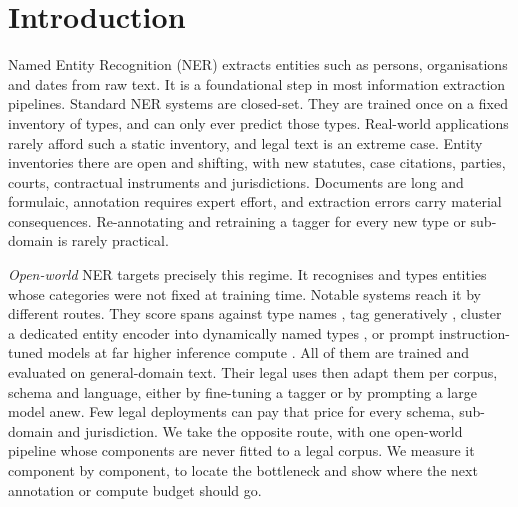 \section{Introduction}
\label{sec:introduction}

Named Entity Recognition (NER) extracts entities such as persons, organisations and dates from raw text. It is a foundational step in most information extraction pipelines. Standard NER systems are closed-set. They are trained once on a fixed inventory of types, and can only ever predict those types. Real-world applications rarely afford such a static inventory, and legal text is an extreme case. Entity inventories there are open and shifting, with new statutes, case citations, parties, courts, contractual instruments and jurisdictions. Documents are long and formulaic, annotation requires expert effort, and extraction errors carry material consequences. Re-annotating and retraining a tagger for every new type or sub-domain is rarely practical.

\emph{Open-world} NER targets precisely this regime. It recognises and types entities whose categories were not fixed at training time. Notable systems reach it by different routes. They score spans against type names \citep{zaratiana2024gliner}, tag generatively \citep{ding2024gner}, cluster a dedicated entity encoder into dynamically named types \citep{genest2025owner}, or prompt instruction-tuned models at far higher inference compute \citep{zhou2024universalner}. All of them are trained and evaluated on general-domain text. Their legal uses then adapt them per corpus, schema and language, either by fine-tuning a tagger or by prompting a large model anew. Few legal deployments can pay that price for every schema, sub-domain and jurisdiction. We take the opposite route, with one open-world pipeline whose components are never fitted to a legal corpus. We measure it component by component, to locate the bottleneck and show where the next annotation or compute budget should go.

